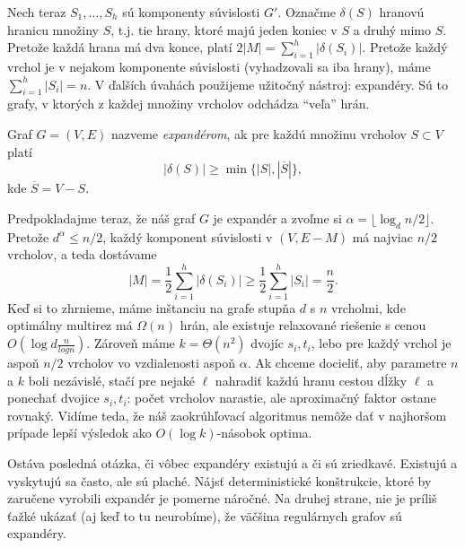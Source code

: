\noindent
Nech teraz $S_1,\ldots,S_h$ sú komponenty súvislosti $G'$. 
Označme $\delta(S)$ hranovú hranicu množiny $S$, t.j. tie hrany, ktoré majú jeden koniec v $S$ a druhý mimo $S$.
Pretože každá hrana má dva konce, platí $2|M|=\sum_{i=1}^h|\delta(S_i)|$. Pretože každý vrchol je v nejakom komponente
súvislosti (vyhadzovali sa iba hrany), máme $\sum_{i=1}^h|S_i|=n$.
V ďalších  úvahách použijeme užitočný nástroj: expandéry. Sú to grafy, v ktorých z každej množiny vrcholov
odchádza ``veľa'' hrán.

\noindent
\begin{framed}
  \begin{dfn}
    Graf $G=(V,E)$ nazveme {\em expandérom}, ak pre každú množinu vrcholov $S\subset V$ platí
    $$|\delta(S)|\ge\min \{ |S|, |\overline{S}|\},$$
    kde $\overline{S}=V-S$. 
  \end{dfn}
\end{framed}

\noindent
Predpokladajme teraz, že náš graf $G$ je expandér a zvoľme si $\alpha=\lfloor\log_d n/2\rfloor$. Pretože
$d^\alpha\le n/2$, každý komponent súvislosti v $(V,E-M)$ má najviac $n/2$ vrcholov, a teda dostávame
$$|M|=\frac{1}{2}\sum_{i=1}^h|\delta(S_i)|\ge\frac{1}{2}\sum_{i=1}^h|S_i|=\frac{n}{2}.$$
Keď si to zhrnieme, máme inštanciu na grafe stupňa $d$ s $n$ vrcholmi, kde optimálny multirez má $\Omega(n)$
hrán, ale existuje relaxované riešenie  s cenou $O\left(\log d\frac{n}{log n}\right)$. Zároveň máme
$k=\Theta(n^2)$ dvojíc $s_i,t_i$, lebo pre každý vrchol je aspoň $n/2$ vrcholov vo vzdialenosti aspoň $\alpha$.
Ak chceme docieliť, aby parametre $n$ a $k$ boli nezávislé, stačí pre nejaké $\ell$ nahradiť 
každú hranu cestou dĺžky $\ell$ a ponechať dvojice $s_i, t_i$: počet vrcholov narastie, ale aproximačný
faktor ostane rovnaký. Vidíme teda, že náš zaokrúhľovací algoritmus nemôže dať v najhoršom prípade
lepší výsledok ako $O(\log k)$-násobok optima.

\noindent
Ostáva posledná otázka, či vôbec expandéry existujú a či sú zriedkavé. Existujú a vyskytujú sa často, ale
sú plaché. Nájsť deterministické konštrukcie, ktoré by zaručene vyrobili
expandér je pomerne náročné. Na druhej strane, nie je príliš ťažké ukázať (aj keď to tu neurobíme),
že väčšina regulárnych grafov sú expandéry.

